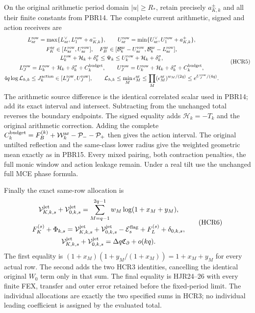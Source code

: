 \documentclass[11pt,a4paper]{article}
\begin{document}
On the original arithmetic period domain $|u|\ge R_*$,
retain precisely $a_{K,k}^\pm$ and all their finite
constants from PBR14. The complete current arithmetic,
signed and action receivers are
\[
\begin{gathered}
 L_{\rm ar}^{\rm row}
   =\max\{L_{\rm ar}^\vee,L_1^{\rm row}+a_{K,k}^-\},\qquad
 U_{\rm ar}^{\rm row}
   =\min\{U_{\rm ar}^\vee,U_1^{\rm row}+a_{K,k}^+\},\\
 F_K^{\rm ar}\in[L_{\rm ar}^{\rm row},U_{\rm ar}^{\rm row}],
 \quad F_B^{\rm ar}\in
 [\mathcal B_k^{\rm ar}-U_{\rm ar}^{\rm row},
  \mathcal B_k^{\rm ar}-L_{\rm ar}^{\rm row}],\\
 L_k^{\rm row}+\mathcal H_k+\delta_k^\sigma
 \le\Psi_k\le U_k^{\rm row}+\mathcal H_k+\delta_k^\sigma,\\
 L_J^{\rm row}=L_k^{\rm row}+\mathcal H_k+\delta_k^\sigma
                                   +C_k^{\rm budget},\qquad
 U_J^{\rm row}=U_k^{\rm row}+\mathcal H_k+\delta_k^\sigma
                                   +C_k^{\rm budget},\\
 4q\log\mathcal L_{h,k}\le J_k^{\rm action}
       \in[L_J^{\rm row},U_J^{\rm row}],\qquad
 \mathcal L_{h,k}\le\min_M\epsilon_M^{\rm ar}
 \le\prod_M(\epsilon_M^{\rm ar})^{w_M/(2q)}
 \le e^{U_J^{\rm row}/(4q)} .
\end{gathered}\tag{HCR5}
\]
The arithmetic source difference is the identical correlated
scalar used in PBR14; add its exact interval and intersect.
Subtracting from the unchanged total reverses the boundary
endpoints. The signed equality adds $\mathcal H_k=-T_k$ and
the original arithmetic correction. Adding the complete
$C_k^{\rm budget}=F_B^{(k)}+\mathcal W_k^{\rm ar}
-\mathcal P_--\mathcal P_+$ then gives the action interval.
The original untilted reflection and the same-class lower
radius give the weighted geometric mean exactly as in
PBR15. Every mixed pairing, both contraction penalties,
the full monic window and action leakage remain. Under
a real tilt use the unchanged full MCE phase formula.

Finally the exact same-row allocation is
\[
\begin{gathered}
 \mathcal V_{K,k,s}^{\rm jet}+\mathcal V_{0,k,s}^{\rm jet}
   =\sum_{M=q-1}^{2q-1}w_M\log(1+x_M+y_M),\\
 F_K^{(s)}+\Phi_{k,s}
   =\mathcal V_{K,k,s}^{\rm jet}+\mathcal V_{0,k,s}^{\rm jet}
        -\mathcal E_s^{\rm flag}+F_L^{(s)}+\delta_{0,k,s},\\
 \mathcal V_{K,k,s}^{\rm jet}+\mathcal V_{0,k,s}^{\rm jet}
      =\Delta q\mathfrak C_\partial+o(kq).
\end{gathered}\tag{HCR6}
\]
The first equality is
$(1+x_M)(1+y_M/(1+x_M))=1+x_M+y_M$ for every actual row.
The second adds the two HCR3 identities, cancelling the
identical original $W_0$ term only in that sum.
The final equality is HJR24--26 with every finite FEX,
transfer and outer error retained before the fixed-period
limit. The individual allocations are exactly the two
specified sums in HCR3; no individual leading coefficient
is assigned by the evaluated total.
\end{document}
